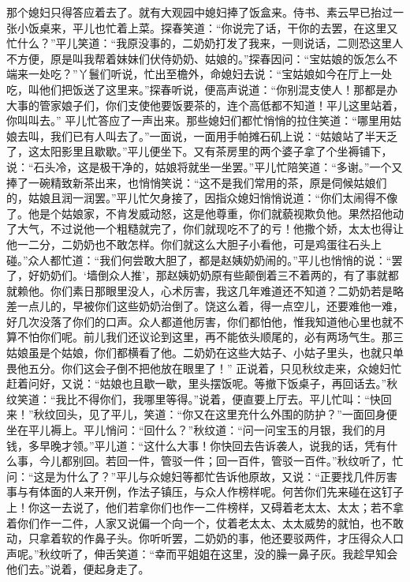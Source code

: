\documentclass[12pt,oneside]{book}
\begin{document}
那个媳妇只得答应着去了。就有大观园中媳妇捧了饭盒来。侍书、素云早已抬过一张小饭桌来，平儿也忙着上菜。探春笑道：“你说完了话，干你的去罢，在这里又忙什么？”平儿笑道：“我原没事的，二奶奶打发了我来，一则说话，二则恐这里人不方便，原是叫我帮着妹妹们伏侍奶奶、姑娘的。”探春因问：“宝姑娘的饭怎么不端来一处吃？”丫鬟们听说，忙出至檐外，命媳妇去说：“宝姑娘如今在厅上一处吃，叫他们把饭送了这里来。”探春听说，便高声说道：“你别混支使人！那都是办大事的管家娘子们，你们支使他要饭要茶的，连个高低都不知道！平儿这里站着，你叫叫去。”
平儿忙答应了一声出来。那些媳妇们都忙悄悄的拉住笑道：“哪里用姑娘去叫，我们已有人叫去了。”一面说，一面用手帕摊石矶上说：“姑娘站了半天乏了，这太阳影里且歇歇。”平儿便坐下。又有茶房里的两个婆子拿了个坐褥铺下，说：“石头冷，这是极干净的，姑娘将就坐一坐罢。”平儿忙陪笑道：“多谢。”一个又捧了一碗精致新茶出来，也悄悄笑说：“这不是我们常用的茶，原是伺候姑娘们的，姑娘且润一润罢。”平儿忙欠身接了，因指众媳妇悄悄说道：“你们太闹得不像了。他是个姑娘家，不肯发威动怒，这是他尊重，你们就藐视欺负他。果然招他动了大气，不过说他一个粗糙就完了，你们就现吃不了的亏！他撒个娇，太太也得让他一二分，二奶奶也不敢怎样。你们就这么大胆子小看他，可是鸡蛋往石头上碰。”众人都忙道：“我们何尝敢大胆了，都是赵姨奶奶闹的。”平儿也悄悄的说：“罢了，好奶奶们。‘墙倒众人推’，那赵姨奶奶原有些颠倒着三不着两的，有了事就都就赖他。你们素日那眼里没人，心术厉害，我这几年难道还不知道？二奶奶若是略差一点儿的，早被你们这些奶奶治倒了。饶这么着，得一点空儿，还要难他一难，好几次没落了你们的口声。众人都道他厉害，你们都怕他，惟我知道他心里也就不算不怕你们呢。前儿我们还议论到这里，再不能依头顺尾的，必有两场气生。那三姑娘虽是个姑娘，你们都横看了他。二奶奶在这些大姑子、小姑子里头，也就只单畏他五分。你们这会子倒不把他放在眼里了！”
正说着，只见秋纹走来，众媳妇忙赶着问好，又说：“姑娘也且歇一歇，里头摆饭呢。等撤下饭桌子，再回话去。”秋纹笑道：“我比不得你们，我哪里等得。”说着，便直要上厅去。平儿忙叫：“快回来！”秋纹回头，见了平儿，笑道：“你又在这里充什么外围的防护？”一面回身便坐在平儿褥上。平儿悄问：“回什么？”秋纹道：“问一问宝玉的月银，我们的月钱，多早晚才领。”平儿道：“这什么大事！你快回去告诉袭人，说我的话，凭有什么事，今儿都别回。若回一件，管驳一件；回一百件，管驳一百件。”秋纹听了，忙问：“这是为什么了？”平儿与众媳妇等都忙告诉他原故，又说：“正要找几件厉害事与有体面的人来开例，作法子镇压，与众人作榜样呢。何苦你们先来碰在这钉子上！你这一去说了，他们若拿你们也作一二件榜样，又碍着老太太、太太；若不拿着你们作一二件，人家又说偏一个向一个，仗着老太太、太太威势的就怕，也不敢动，只拿着软的作鼻子头。你听听罢，二奶奶的事，他还要驳两件，才压得众人口声呢。”秋纹听了，伸舌笑道：“幸而平姐姐在这里，没的臊一鼻子灰。我趁早知会他们去。”说着，便起身走了。
\end{document}
